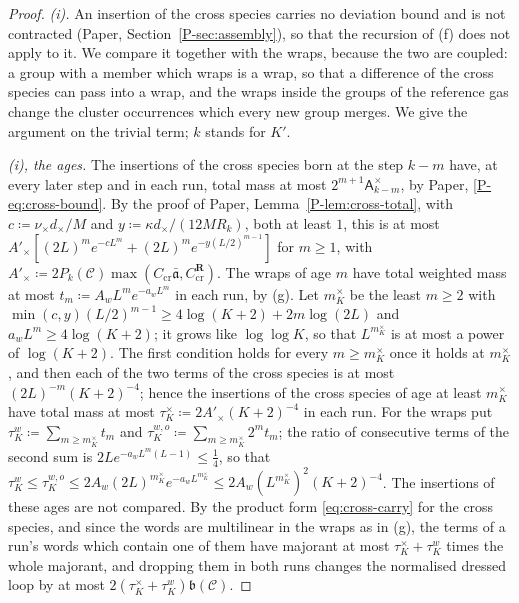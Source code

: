 \documentclass[11pt]{preprint}
\numberwithin{equation}{section}
\theoremstyle{definition}
\theoremstyle{remark}
\theoremstyle{plain}
\begin{document}
\begin{proof}
\emph{(i).} An insertion of the cross species carries no deviation bound and is not contracted (Paper, Section~\ref{P-sec:assembly}), so that the recursion of (f) does not apply to it. We compare it together with the wraps, because the two are coupled: a group with a member which wraps is a wrap, so that a difference of the cross species can pass into a wrap, and the wraps inside the groups of the reference gas change the cluster occurrences which every new group merges. We give the argument on the trivial term; $k$ stands for $K'$.

\emph{(i), the ages.} The insertions of the cross species born at the step $k - m$ have, at every later step and in each run, total mass at most $2^{m+1}\mathsf A^\times_{k-m}$, by Paper, \eqref{P-eq:cross-bound}. By the proof of Paper, Lemma~\ref{P-lem:cross-total}, with $c \coloneqq \nu_\times d_\times/M$ and $y \coloneqq \kappa d_\times/(12MR_k)$, both at least $1$, this is at most $A'_\times[(2L)^me^{-cL^m} + (2L)^me^{-y(L/2)^{m-1}}]$ for $m \geq 1$, with $A'_\times \coloneqq 2P_k(\mathcal C)\max(C_{\mathrm{cr}}\bar{\mathfrak a}, C^{\mathbf R}_{\mathrm{cr}})$. The wraps of age $m$ have total weighted mass at most $t_m \coloneqq A_wL^me^{-a_wL^m}$ in each run, by (g). Let $m^\times_K$ be the least $m \geq 2$ with $\min(c, y)(L/2)^{m-1} \geq 4\log(K + 2) + 2m\log(2L)$ and $a_wL^m \geq 4\log(K + 2)$; it grows like $\log\log K$, so that $L^{m^\times_K}$ is at most a power of $\log(K + 2)$. The first condition holds for every $m \geq m^\times_K$ once it holds at $m^\times_K$, and then each of the two terms of the cross species is at most $(2L)^{-m}(K + 2)^{-4}$; hence the insertions of the cross species of age at least $m^\times_K$ have total mass at most $\tau^\times_K \coloneqq 2A'_\times(K + 2)^{-4}$ in each run. For the wraps put $\tau^w_K \coloneqq \sum_{m \geq m^\times_K}t_m$ and $\tau^{w,o}_K \coloneqq \sum_{m \geq m^\times_K}2^mt_m$; the ratio of consecutive terms of the second sum is $2Le^{-a_wL^m(L-1)} \leq \frac14$, so that $\tau^w_K \leq \tau^{w,o}_K \leq 2A_w(2L)^{m^\times_K}e^{-a_wL^{m^\times_K}} \leq 2A_w(L^{m^\times_K})^2(K + 2)^{-4}$. The insertions of these ages are not compared. By the product form \eqref{eq:cross-carry} for the cross species, and since the words are multilinear in the wraps as in (g), the terms of a run's words which contain one of them have majorant at most $\tau^\times_K + \tau^w_K$ times the whole majorant, and dropping them in both runs changes the normalised dressed loop by at most $2(\tau^\times_K + \tau^w_K)\mathfrak b(\mathcal C)$.


\end{proof}
\end{document}
